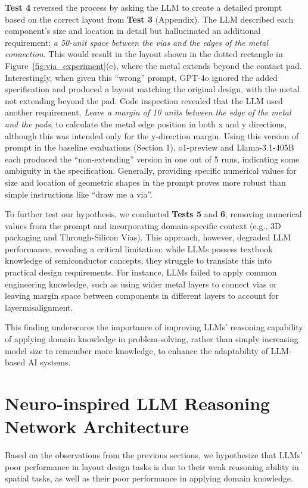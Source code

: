 \documentclass{article}
\begin{document}
\textbf{Test 4} reversed the process by asking the LLM to create a detailed prompt based on the correct layout from \textbf{Test 3} (Appendix). The LLM described each component's size and location in detail but hallucinated an additional requirement: \textit{a 50-unit space between the vias and the edges of the metal connection}. This would result in the layout shown in the dotted rectangle in Figure~\ref{fig:via_experiment}(e), where the metal extends beyond the contact pad. Interestingly, when given this ``wrong'' prompt, GPT-4o ignored the added specification and produced a layout matching the original design, with the metal not extending beyond the pad. Code inspection revealed that the LLM used another requirement, \textit{Leave a margin of 10 units between the edge of the metal and the pads}, to calculate the metal edge position in both x and y directions, although this was intended only for the y-direction margin. Using this version of prompt in the baseline evaluations (Section 1), o1-preview and Llama-3.1-405B each produced the ``non-extending'' version in one out of 5 runs, indicating some ambiguity in the specification. Generally, providing specific numerical values for size and location of geometric shapes in the prompt proves more robust than simple instructions like ``draw me a via''.

To further test our hypothesis, we conducted \textbf{Tests 5} and \textbf{6}, removing numerical values from the prompt and incorporating domain-specific context (e.g., 3D packaging and Through-Silicon Vias). This approach, however, degraded LLM performance, revealing a critical limitation: while LLMs possess textbook knowledge of semiconductor concepts, they struggle to translate this into practical design requirements. For instance, LLMs failed to apply common engineering knowledge, such as using wider metal layers to connect vias or leaving margin space between components in different layers to account for layermisalignment.

This finding underscores the importance of improving LLMs' reasoning capability of applying domain knowledge in problem-solving, rather than simply increasing model size to remember more knowledge, to enhance the adaptability of LLM-based AI systems.

\section{Neuro-inspired LLM Reasoning Network Architecture}

Based on the observations from the previous sections, we hypothesize that LLMs' poor performance in layout design tasks is due to their weak reasoning ability in spatial tasks, as well as their poor performance in applying domain knowledge. 
\end{document}
